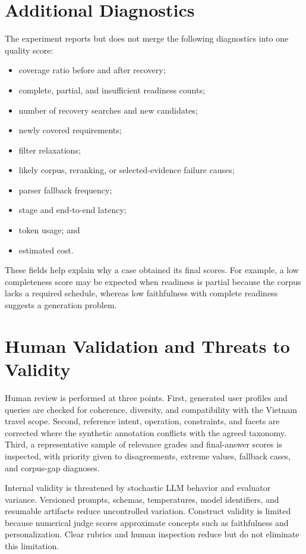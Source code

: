 \section{Additional Diagnostics}

The experiment reports but does not merge the following diagnostics into one
quality score:

\begin{itemize}
    \item coverage ratio before and after recovery;
    \item complete, partial, and insufficient readiness counts;
    \item number of recovery searches and new candidates;
    \item newly covered requirements;
    \item filter relaxations;
    \item likely corpus, reranking, or selected-evidence failure causes;
    \item parser fallback frequency;
    \item stage and end-to-end latency;
    \item token usage; and
    \item estimated cost.
\end{itemize}

These fields help explain why a case obtained its final scores. For example, a
low completeness score may be expected when readiness is partial because the
corpus lacks a required schedule, whereas low faithfulness with complete
readiness suggests a generation problem.

\section{Human Validation and Threats to Validity}

Human review is performed at three points. First, generated user profiles and
queries are checked for coherence, diversity, and compatibility with the
Vietnam travel scope. Second, reference intent, operation, constraints, and
facets are corrected where the synthetic annotation conflicts with the agreed
taxonomy. Third, a representative sample of relevance grades and final-answer
scores is inspected, with priority given to disagreements, extreme values,
fallback cases, and corpus-gap diagnoses.

Internal validity is threatened by stochastic LLM behavior and evaluator
variance. Versioned prompts, schemas, temperatures, model identifiers, and
resumable artifacts reduce uncontrolled variation. Construct validity is
limited because numerical judge scores approximate concepts such as
faithfulness and personalization. Clear rubrics and human inspection reduce but
do not eliminate this limitation.

